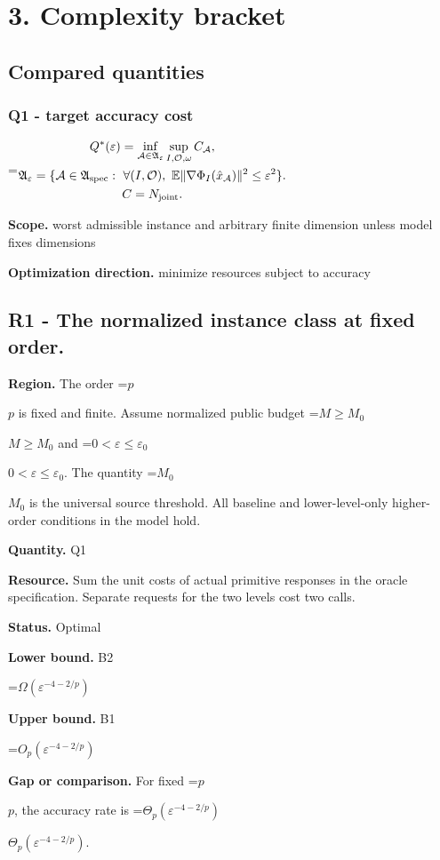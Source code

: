 \documentclass[10pt,a4paper]{article}
\newcommand{\AtlasMath}[1]{\par\begingroup\centering\setbox0=\hbox{$\displaystyle #1$}\ifdim\wd0>1.4\linewidth\typeout{ATLAS WIDE FORMULA: \the\wd0}\fi\ifdim\wd0>\linewidth\resizebox{\linewidth}{!}{\box0}\else\box0\fi\par\endgroup}
\newcommand{\AtlasInlineMath}[1]{\begingroup\setbox0=\hbox{$#1$}\ifdim\wd0>.4\linewidth\endgroup\AtlasMath{#1}\else\endgroup$#1$\fi}
\begin{document}
\section{3. Complexity bracket}
\subsection{Compared quantities}
\subsubsection{Q1 - target accuracy cost}
\AtlasMath{\begin{gathered}Q^*(\varepsilon)=\inf_{\mathcal A\in\mathfrak A_\varepsilon}\sup_{I,\mathcal O,\omega}C_{\mathcal A},\\\mathfrak A_\varepsilon=\{\mathcal A\in\mathfrak A_{\rm spec}:\ \forall(I,\mathcal O),\ \mathbb E\|\nabla\Phi_I(\hat x_{\mathcal A})\|^2\le\varepsilon^2\}.\\C=N_{\mathrm{joint}}.\end{gathered}}
\textbf{Scope.} worst admissible instance and arbitrary finite dimension unless model fixes dimensions

\textbf{Optimization direction.} minimize resources subject to accuracy

\subsection{R1 - The normalized instance class at fixed order.}
\textbf{Region.} The order \AtlasInlineMath{p} is fixed and finite. Assume normalized public budget \AtlasInlineMath{M\ge M_0} and \AtlasInlineMath{0<\varepsilon\le\varepsilon_0}. The quantity \AtlasInlineMath{M_0} is the universal source threshold. All baseline and lower-level-only higher-order conditions in the model hold.

\textbf{Quantity.} Q1

\textbf{Resource.} Sum the unit costs of actual primitive responses in the oracle specification. Separate requests for the two levels cost two calls.

\textbf{Status.} Optimal

\textbf{Lower bound.} B2

\AtlasMath{\Omega (\varepsilon ^{-4-2/p})}
\textbf{Upper bound.} B1

\AtlasMath{O_p(\varepsilon ^{-4-2/p})}
\textbf{Gap or comparison.} For fixed \AtlasInlineMath{p}, the accuracy rate is \AtlasInlineMath{\Theta_p(\varepsilon^{-4-2/p})}.
\end{document}
